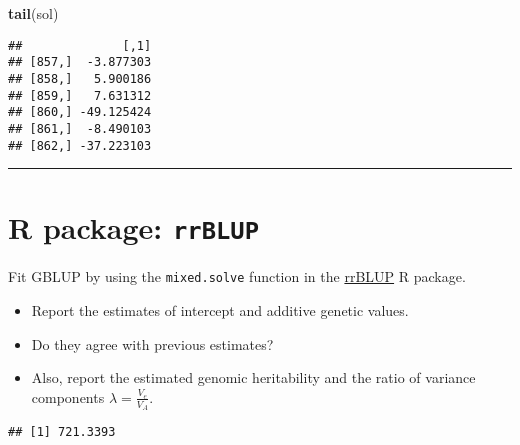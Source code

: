 \documentclass[
]{article}
\newenvironment{Shaded}{\begin{snugshade}}{\end{snugshade}}
\newcommand{\AttributeTok}[1]{\textcolor[rgb]{0.13,0.29,0.53}{#1}}
\newcommand{\CommentTok}[1]{\textcolor[rgb]{0.56,0.35,0.01}{\textit{#1}}}
\newcommand{\FunctionTok}[1]{\textcolor[rgb]{0.13,0.29,0.53}{\textbf{#1}}}
\newcommand{\NormalTok}[1]{#1}
\newcommand{\OtherTok}[1]{\textcolor[rgb]{0.56,0.35,0.01}{#1}}
\newcommand{\SpecialCharTok}[1]{\textcolor[rgb]{0.81,0.36,0.00}{\textbf{#1}}}
\providecommand{\tightlist}{%
  \setlength{\itemsep}{0pt}\setlength{\parskip}{0pt}}
\begin{document}
\begin{Shaded}
\begin{Highlighting}[]
\FunctionTok{tail}\NormalTok{(sol)}
\end{Highlighting}
\end{Shaded}

\begin{verbatim}
##              [,1]
## [857,]  -3.877303
## [858,]   5.900186
## [859,]   7.631312
## [860,] -49.125424
## [861,]  -8.490103
## [862,] -37.223103
\end{verbatim}

\begin{center}\rule{0.5\linewidth}{0.5pt}\end{center}

\section{\texorpdfstring{R package:
\texttt{rrBLUP}}{R package: rrBLUP}}\label{r-package-rrblup}

Fit GBLUP by using the \texttt{mixed.solve} function in the
\href{https://cran.r-project.org/web/packages/rrBLUP/index.html}{rrBLUP}
R package.

\begin{itemize}
\tightlist
\item
  Report the estimates of intercept and additive genetic values.
\item
  Do they agree with previous estimates?
\item
  Also, report the estimated genomic heritability and the ratio of
  variance components \(\lambda = \frac{V_e}{V_A}\).
\end{itemize}

\begin{Shaded}
\end{Shaded}

\begin{verbatim}
## [1] 721.3393
\end{verbatim}

\begin{Shaded}
\end{Shaded}
\end{document}
